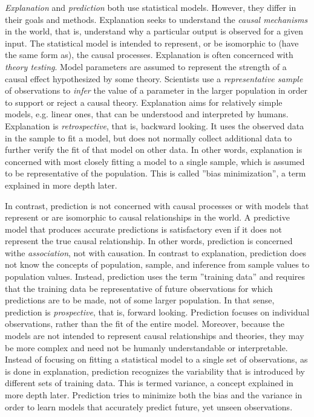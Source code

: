 \emph{Explanation} and \emph{prediction} both use statistical models. However, they differ in their goals and methods. Explanation seeks to understand the \emph{causal mechanisms} in the world, that is, understand why a particular output is observed for a given input. The statistical model is intended to represent, or be isomorphic to (have the same form as), the causal processes. Explanation is often concernced with \emph{theory testing}. Model parameters are assumed to represent the strength of a causal effect hypothesized by some theory. Scientists use a \emph{representative sample} of observations to \emph{infer} the value of a parameter in the larger population in order to support or reject a causal theory. Explanation aims for relatively simple models, e.g. linear ones, that can be understood and interpreted by humans. Explanation is \emph{retrospective}, that is, backward looking. It uses the observed data in the sample to fit a model, but does not normally collect additional data to further verify the fit of that model on other data. In other words, explanation is concerned with most closely fitting a model to a single sample, which is assumed to be representative of the population. This is called ''bias minimization'', a term explained in more depth later. 

In contrast, prediction is not concerned with causal processes or with models that represent or are isomorphic to causal relationships in the world. A predictive model that produces accurate predictions is satisfactory even if it does not represent the true causal relationship. In other words, prediction is concerned withe \emph{association}, not with causation. In contrast to explanation, prediction does not know the concepts of population, sample, and inference from sample values to population values. Instead, prediction uses the term ''training data'' and requires that the training data be representative of future observations for which predictions are to be made, not of some larger population. In that sense, prediction is \emph{prospective}, that is, forward looking. Prediction focuses on individual observations, rather than the fit of the entire model. Moreover, because the models are not intended to represent causal relationships and theories, they may be more complex and need not be humanly understandable or interpretable. Instead of focusing on fitting a statistical model to a single set of observations, as is done in explanation, prediction recognizes the variability that is introduced by different sets of training data. This is termed variance, a concept explained in more depth later. Prediction tries to minimize both the bias and the variance in order to learn models that accurately predict future, yet unseen observations.

